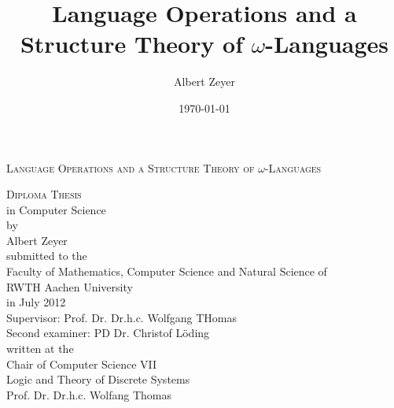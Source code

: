 \documentclass{article}
\begin{document}
\title{Language Operations and a Structure Theory of $\omega$-Languages}
\author{Albert Zeyer}
\date{\today}

\begin{titlepage}
\begin{center}
\setlength{\parskip}{2ex plus0.5ex minus0.2ex}
\setlength{\baselineskip}{5ex}
\textsc{\LARGE Language Operations and a Structure Theory of $\omega$-Languages}\\[1.5cm]

\setlength{\baselineskip}{3ex}

\textsc{Diploma Thesis} \\
in Computer Science \\[0.7cm]

by \\
Albert Zeyer \\[3cm]

submitted to the \\
Faculty of Mathematics, Computer Science and Natural Science of \\
RWTH Aachen University \\[1.5cm]

in July 2012 \\[1.5cm]

Supervisor: Prof. Dr. Dr.h.c. Wolfgang THomas \\
Second examiner: PD Dr. Christof Löding \\[1.5cm]

written at the \\
Chair of Computer Science VII \\
Logic and Theory of Discrete Systems \\
Prof. Dr. Dr.h.c. Wolfang Thomas

\end{center}
\end{titlepage}

\setlength{\parskip}{1ex}
\tableofcontents

\setlength{\parindent}{0pt}
\setlength{\parskip}{2ex plus0.5ex minus0.2ex}




%







\printindex
\end{document}

